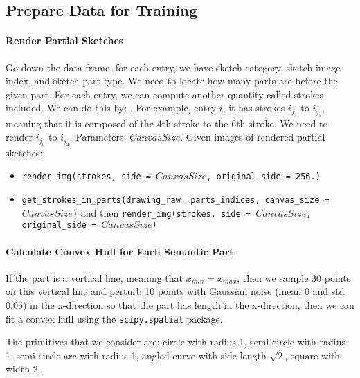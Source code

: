 \subsection{Prepare Data for Training} \label{appendix:prepare_data}

\paragraph{Render Partial Sketches}
Go down the data-frame, for each entry, we have sketch category, sketch image index, and sketch part type. We need to locate how many parts are before the given part.  
For each entry, we can compute another quantity called strokes included. We can do this by: .
For example, entry $i$, it has strokes $i_{j_3}$ to $i_{j_5}$, meaning that it is composed of the 4th stroke to the 6th stroke. We need to render $i_{j_0}$ to $i_{j_2}$. 
Parameters: $CanvasSize$. Given images of rendered partial sketches: 
\begin{itemize}
    \item \texttt{render\_img(strokes, side = $CanvasSize$, original\_side = 256.)}
    \item \texttt{get\_strokes\_in\_parts(drawing\_raw, parts\_indices, canvas\_size = $CanvasSize$)} and then \texttt{render\_img(strokes, side = $CanvasSize$, original\_side = $CanvasSize$)}
\end{itemize}

\paragraph{Calculate Convex Hull for Each Semantic Part} 
If the part is a vertical line, meaning that $x_{min} = x_{max}$, then we sample 30 points on this vertical line and perturb 10 points with Gaussian noise (mean $0$ and std $0.05$) in the x-direction so that the part has length in the x-direction, then we can fit a convex hull using the \texttt{scipy.spatial} package. 


The primitives that we consider are: circle with radius 1, semi-circle with radius 1, semi-circle arc with radius 1, angled curve with side length $\sqrt{2}$, square with width 2. 